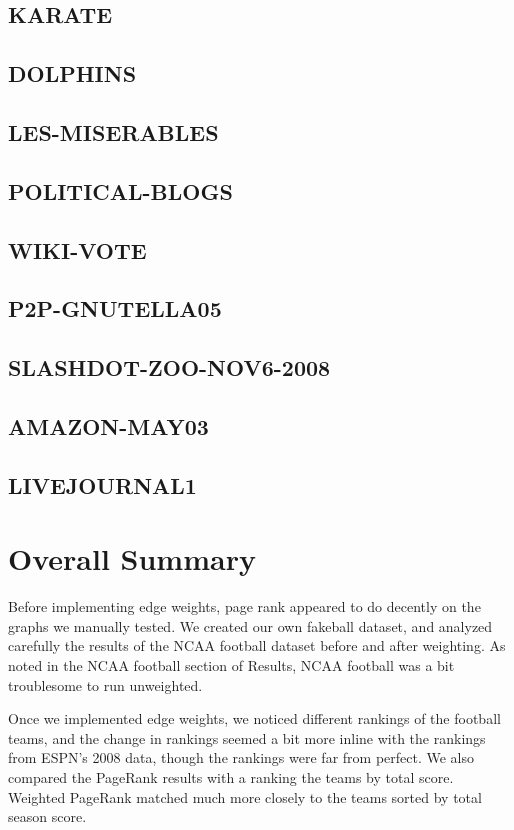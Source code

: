\documentclass[draft]{report}
\newcommand{\pagerank}{PageRank }
\begin{document}
%
\subsection{KARATE}
%
\subsection{DOLPHINS}
%
\subsection{LES-MISERABLES}
%
\subsection{POLITICAL-BLOGS}
\subsection{WIKI-VOTE}
\subsection{P2P-GNUTELLA05}
\subsection{SLASHDOT-ZOO-NOV6-2008}
\subsection{AMAZON-MAY03}
\subsection{LIVEJOURNAL1}

\section{Overall Summary}
Before implementing edge weights, page rank appeared to do decently on the
graphs we manually tested. We created our own fakeball dataset, and analyzed
carefully the results of the NCAA football dataset before and after weighting.
As noted in the NCAA football section of Results, NCAA football was a bit
troublesome to run unweighted.

Once we implemented edge weights, we noticed different rankings of the football
teams, and the change in rankings seemed a bit more inline with the rankings
from ESPN's 2008 data, though the rankings were far from perfect. We also
compared the \pagerank results with a ranking the teams by total score. Weighted
\pagerank matched much more closely to the teams sorted by total season score.
\end{document}
